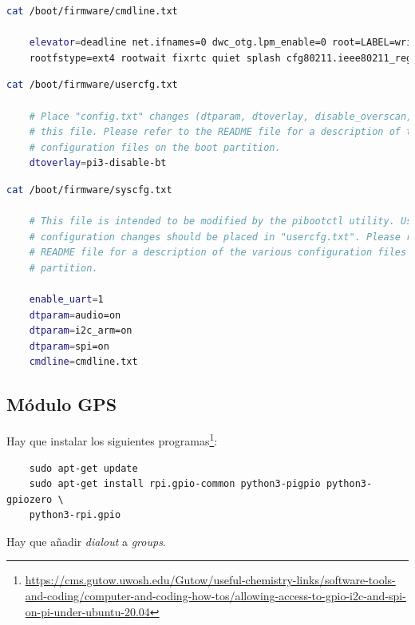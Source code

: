 \begin{lstlisting}[language=bash]
	cat /boot/firmware/cmdline.txt 
	
	elevator=deadline net.ifnames=0 dwc_otg.lpm_enable=0 root=LABEL=writable \
	rootfstype=ext4 rootwait fixrtc quiet splash cfg80211.ieee80211_regdom=GB
\end{lstlisting}

\begin{lstlisting}[language=bash]
	cat /boot/firmware/usercfg.txt 
	
	# Place "config.txt" changes (dtparam, dtoverlay, disable_overscan, etc.) in
	# this file. Please refer to the README file for a description of the various
	# configuration files on the boot partition.
	dtoverlay=pi3-disable-bt
\end{lstlisting}

\begin{lstlisting}[language=bash]
	cat /boot/firmware/syscfg.txt 
	
	# This file is intended to be modified by the pibootctl utility. User
	# configuration changes should be placed in "usercfg.txt". Please refer to the
	# README file for a description of the various configuration files on the boot
	# partition.
	
	enable_uart=1
	dtparam=audio=on
	dtparam=i2c_arm=on
	dtparam=spi=on
	cmdline=cmdline.txt	
\end{lstlisting}


\subsection*{Módulo GPS}
\label{subsec:anexomotores}

Hay que instalar los siguientes programas\footnote{\url{https://cms.gutow.uwosh.edu/Gutow/useful-chemistry-links/software-tools-and-coding/computer-and-coding-how-tos/allowing-access-to-gpio-i2c-and-spi-on-pi-under-ubuntu-20.04}}: 

\begin{verbatim}
	sudo apt-get update
	sudo apt-get install rpi.gpio-common python3-pigpio python3-gpiozero \
	python3-rpi.gpio
\end{verbatim}

Hay que añadir \textit{dialout} a \textit{groups}.